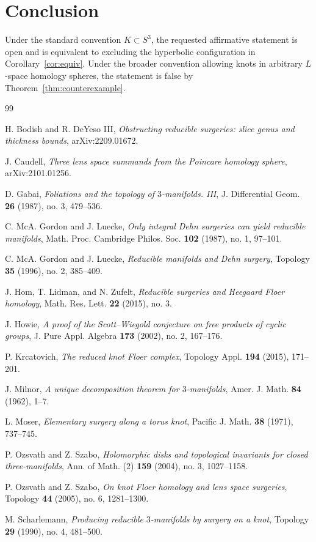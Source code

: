 \documentclass[11pt]{article}
\theoremstyle{definition}
\theoremstyle{remark}
\begin{document}
\section*{Conclusion}

Under the standard convention \(K\subset S^{3}\), the requested affirmative
statement is open and is equivalent to excluding the hyperbolic configuration
in Corollary~\ref{cor:equiv}.  Under the broader convention allowing knots in
arbitrary \(L\)-space homology spheres, the statement is false by
Theorem~\ref{thm:counterexample}.

\begin{thebibliography}{99}

H. Bodish and R. DeYeso III,
\emph{Obstructing reducible surgeries: slice genus and thickness bounds},
arXiv:2209.01672.

J. Caudell,
\emph{Three lens space summands from the Poincare homology sphere},
arXiv:2101.01256.

D. Gabai,
\emph{Foliations and the topology of \(3\)-manifolds. III},
J. Differential Geom. \textbf{26} (1987), no. 3, 479--536.

C. McA. Gordon and J. Luecke,
\emph{Only integral Dehn surgeries can yield reducible manifolds},
Math. Proc. Cambridge Philos. Soc. \textbf{102} (1987), no. 1, 97--101.

C. McA. Gordon and J. Luecke,
\emph{Reducible manifolds and Dehn surgery},
Topology \textbf{35} (1996), no. 2, 385--409.

J. Hom, T. Lidman, and N. Zufelt,
\emph{Reducible surgeries and Heegaard Floer homology},
Math. Res. Lett. \textbf{22} (2015), no. 3.

J. Howie,
\emph{A proof of the Scott--Wiegold conjecture on free products of cyclic groups},
J. Pure Appl. Algebra \textbf{173} (2002), no. 2, 167--176.

P. Krcatovich,
\emph{The reduced knot Floer complex},
Topology Appl. \textbf{194} (2015), 171--201.

J. Milnor,
\emph{A unique decomposition theorem for \(3\)-manifolds},
Amer. J. Math. \textbf{84} (1962), 1--7.

L. Moser,
\emph{Elementary surgery along a torus knot},
Pacific J. Math. \textbf{38} (1971), 737--745.

P. Ozsvath and Z. Szabo,
\emph{Holomorphic disks and topological invariants for closed three-manifolds},
Ann. of Math. (2) \textbf{159} (2004), no. 3, 1027--1158.

P. Ozsvath and Z. Szabo,
\emph{On knot Floer homology and lens space surgeries},
Topology \textbf{44} (2005), no. 6, 1281--1300.

M. Scharlemann,
\emph{Producing reducible \(3\)-manifolds by surgery on a knot},
Topology \textbf{29} (1990), no. 4, 481--500.

\end{thebibliography}
\end{document}
